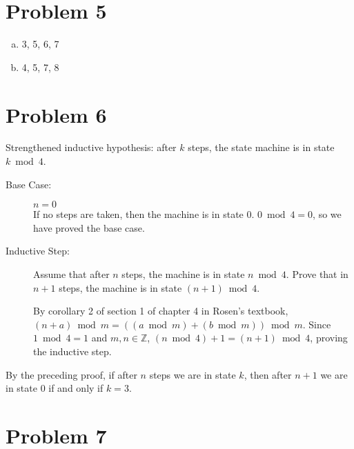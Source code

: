 \documentclass[11pt]{article}
\begin{document}
			
		
\section*{Problem 5}
	\begin{enumerate}[(a)]
		\item 3, 5, 6, 7
		\item 4, 5, 7, 8
	\end{enumerate}


\section*{Problem 6}
	Strengthened inductive hypothesis: after $k$ steps, the state machine is in state $k \bmod 4$.
	
	\begin{description}
	\item[Base Case:] $n=0$\\
	If no steps are taken, then the machine is in state $0$. $0 \bmod 4=0$, so we have proved the base case.

	\item[Inductive Step:] Assume that after $n$ steps, the machine is in state $n \bmod 4$. Prove that in $n+1$ steps, the machine is in state $(n+1)\bmod 4$.
	
	By corollary 2 of section 1 of chapter 4 in Rosen's textbook, $(n+a) \bmod m = ((a\bmod m) + (b\bmod m)) \bmod m$. Since $1\bmod4 = 1$ and $ m, n\in\mathbb{Z}$, $(n\bmod 4) + 1 = (n+1)\bmod 4$, proving the inductive step.

	\end{description}
By the preceding proof, if after $n$ steps we are in state $k$, then after $n+1$ we are in state $0$ if and only if $k=3$.
	
	




\section*{Problem 7}
\end{document}
